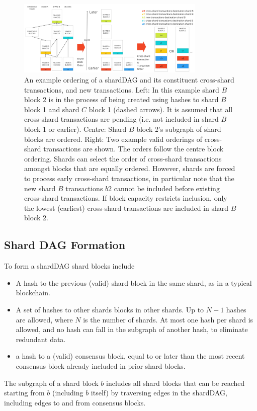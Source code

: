 \begin{figure}
	\centering
	\includegraphics[width=0.8\textwidth]{figures/OrderExample.jpg}
	\caption{An example ordering of a shardDAG and its constituent cross-shard transactions, and new transactions. 
		Left: In this example shard $B$ block 2 is in the process of being created using hashes to shard $B$ block 1 and shard $C$ block 1 (dashed arrows). 
		It is assumed that all cross-shard transactions are pending (i.e. not included in shard $B$ block 1 or earlier). 
		Centre: Shard $B$ block 2’s subgraph of shard blocks are ordered. 
		Right: Two example valid orderings of cross-shard transactions are shown. 
		The orders follow the centre block ordering. 
		Shards can select the order of cross-shard transactions amongst blocks that are equally ordered. 
		However, shards are forced to process early cross-shard transactions, in particular note that the new shard $B$ transactions $b2$ cannot be included before existing cross-shard transactions. If block capacity restricts inclusion, only the lowest (earliest) cross-shard transactions are included in shard $B$ block 2. }
	\label{figure:order-example}
\end{figure}

\subsection{Shard DAG Formation}
To form a shardDAG shard blocks include
\begin{itemize}
	\item A hash to the previous (valid) shard block in the same shard, as in a typical blockchain.
	\item A set of hashes to other shards blocks in other shards.
	Up to $N-1$ hashes are allowed, where $N$ is the number of shards. 
	At most one hash per shard is allowed, and no hash can fall in the subgraph of another hash, to eliminate redundant data.
	\item a hash to a (valid) consensus block, equal to or later than the most recent consensus block already included in prior shard blocks.	
\end{itemize}
The subgraph of a shard block $b$ includes all shard blocks that can be reached starting from $b$ (including $b$ itself) by traversing edges in the shardDAG, including edges to and from consensus blocks.

